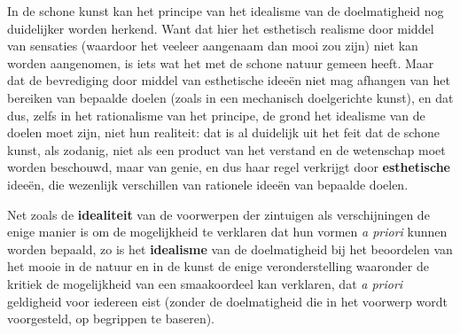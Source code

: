 In de schone kunst kan het principe van het idealisme van de doelmatigheid nog duidelijker worden herkend. Want dat hier het esthetisch realisme door middel van sensaties (waardoor het veeleer aangenaam dan mooi zou zijn) niet kan worden aangenomen, is iets wat het met de schone natuur gemeen heeft. Maar dat de bevrediging door middel van esthetische ideeën niet mag afhangen van het bereiken van bepaalde doelen (zoals in een mechanisch doelgerichte kunst), en dat dus, zelfs in het rationalisme van het principe, de grond het idealisme van de doelen moet zijn, niet hun realiteit: dat is al duidelijk uit het feit dat de schone kunst, als zodanig, niet als een product van het verstand en de wetenschap moet worden beschouwd, maar van genie, en dus haar regel verkrijgt door \textbf{esthetische} ideeën, die wezenlijk verschillen van rationele ideeën van bepaalde doelen.

Net zoals de \textbf{idealiteit} van de voorwerpen der zintuigen als verschijningen de enige manier is om de mogelijkheid te verklaren dat hun vormen \textit{a priori} kunnen worden bepaald, zo is het \textbf{idealisme} van de doelmatigheid bij het beoordelen van het mooie in de natuur en in de kunst de enige veronderstelling waaronder de kritiek de mogelijkheid van een smaakoordeel kan verklaren, dat \textit{a priori} geldigheid voor iedereen eist (zonder de doelmatigheid die in het voorwerp wordt voorgesteld, op begrippen te baseren).

